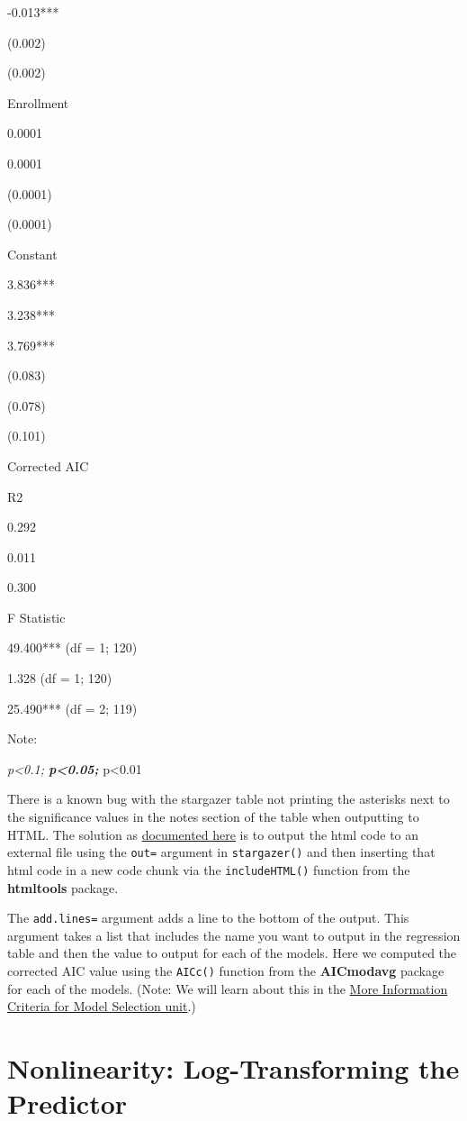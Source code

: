 \documentclass[]{book}
\begin{document}
-0.013***

(0.002)

(0.002)

Enrollment

0.0001

0.0001

(0.0001)

(0.0001)

Constant

3.836***

3.238***

3.769***

(0.083)

(0.078)

(0.101)

Corrected AIC

R2

0.292

0.011

0.300

F Statistic

49.400*** (df = 1; 120)

1.328 (df = 1; 120)

25.490*** (df = 2; 119)

Note:

\emph{p\textless{}0.1; \textbf{p\textless{}0.05; }}p\textless{}0.01

There is a known bug with the stargazer table not printing the asterisks next to the significance values in the notes section of the table when outputting to HTML. The solution as \href{https://stackoverflow.com/questions/51883610/p-values-significance-not-showed-in-stargazer-html-regression-table}{documented here} is to output the html code to an external file using the \texttt{out=} argument in \texttt{stargazer()} and then inserting that html code in a new code chunk via the \texttt{includeHTML()} function from the \textbf{htmltools} package.

The \texttt{add.lines=} argument adds a line to the bottom of the output. This argument takes a list that includes the name you want to output in the regression table and then the value to output for each of the models. Here we computed the corrected AIC value using the \texttt{AICc()} function from the \textbf{AICmodavg} package for each of the models. (Note: We will learn about this in the \protect\hyperlink{moreinfocrit}{More Information Criteria for Model Selection unit}.)

\hypertarget{nonlinearity-log-transforming-the-predictor}{%
\chapter{Nonlinearity: Log-Transforming the Predictor}\label{nonlinearity-log-transforming-the-predictor}}
\end{document}
